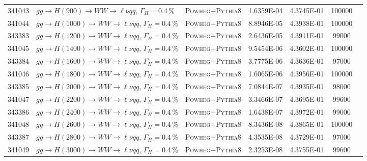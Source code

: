 \begin{landscape}
\begin{table}[!htb]
\begin{footnotesize}
\begin{center}
\begin{tabular}{|c|l|c|c|c|c|r|}
					341043 & $gg \to H(900) \to WW \to \ell\nu qq$, $\Gamma_H=0.4\,\%$ & \textsc{Powheg}+\textsc{Pythia8} & 1.6359E-04 & 4.3745E-01 & 100000 \\
					341044 & $gg \to H(1000) \to WW \to \ell\nu qq$, $\Gamma_H=0.4\,\%$ & \textsc{Powheg}+\textsc{Pythia8} & 8.8946E-05 & 4.3938E-01 & 100000 \\
					343383 & $gg \to H(1200) \to WW \to \ell\nu qq$, $\Gamma_H=0.4\,\%$ & \textsc{Powheg}+\textsc{Pythia8} & 2.6436E-05 & 4.3911E-01 &  99000 \\
					341045 & $gg \to H(1400) \to WW \to \ell\nu qq$, $\Gamma_H=0.4\,\%$ & \textsc{Powheg}+\textsc{Pythia8} & 9.5454E-06 & 4.3602E-01 & 100000 \\
					343384 & $gg \to H(1600) \to WW \to \ell\nu qq$, $\Gamma_H=0.4\,\%$ & \textsc{Powheg}+\textsc{Pythia8} & 3.7775E-06 & 4.3636E-01 & 97000 \\
					341046 & $gg \to H(1800) \to WW \to \ell\nu qq$, $\Gamma_H=0.4\,\%$ & \textsc{Powheg}+\textsc{Pythia8} & 1.6065E-06 & 4.3956E-01 & 100000 \\
					343385 & $gg \to H(2000) \to WW \to \ell\nu qq$, $\Gamma_H=0.4\,\%$ & \textsc{Powheg}+\textsc{Pythia8} & 7.0844E-07 & 4.3935E-01 & 98000 \\
					341047 & $gg \to H(2200) \to WW \to \ell\nu qq$, $\Gamma_H=0.4\,\%$ & \textsc{Powheg}+\textsc{Pythia8} & 3.3466E-07 & 4.3695E-01 & 99600 \\
					343386 & $gg \to H(2400) \to WW \to \ell\nu qq$, $\Gamma_H=0.4\,\%$ & \textsc{Powheg}+\textsc{Pythia8} & 1.6438E-07 & 4.3972E-01 & 99000 \\
					341048 & $gg \to H(2600) \to WW \to \ell\nu qq$, $\Gamma_H=0.4\,\%$ & \textsc{Powheg}+\textsc{Pythia8} & 8.3436E-08 & 4.3865E-01 & 100000 \\
					343387 & $gg \to H(2800) \to WW \to \ell\nu qq$, $\Gamma_H=0.4\,\%$ & \textsc{Powheg}+\textsc{Pythia8} & 4.3535E-08 & 4.3729E-01 & 97000 \\
					341049 & $gg \to H(3000) \to WW \to \ell\nu qq$, $\Gamma_H=0.4\,\%$ & \textsc{Powheg}+\textsc{Pythia8} & 2.3253E-08 & 4.3755E-01 & 99600 \\
					\hline
				\end{tabular}
			\end{center}
		\end{footnotesize}
	\end{table}
	

\end{landscape}
